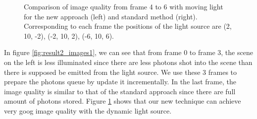 \begin{figure}
\begin{center}
{\begin{tabular}{c}
\end{tabular}
}%
\renewcommand{\thefigure}{\thechapter.\arabic{figure}}
\caption[Comparison of image quality from frame 4 to 6 with moving light]{Comparison of image quality from frame 4 to 6 with moving light for the new approach (left) and standard method (right). Corresponding to each frame the positions of the light source are (2, 10, -2), (-2, 10, 2), (-6, 10, 6). }
\label{fig:result2_images2}
\end{center}
\end{figure}

In figure \ref{fig:result2_images1}, we can see that from frame 0 to frame 3, the scene on the left is less illuminated since there are less photons shot into the scene than there is supposed be emitted from the light source. We use these 3 frames to prepare the photons queue by update it incrementally. In the last frame, the image quality is similar to that of the standard approach since there are full amount of photons stored. Figure \ref{fig:result2_images2} shows that our new technique can achieve very goog image quality with the dynamic light source. 



